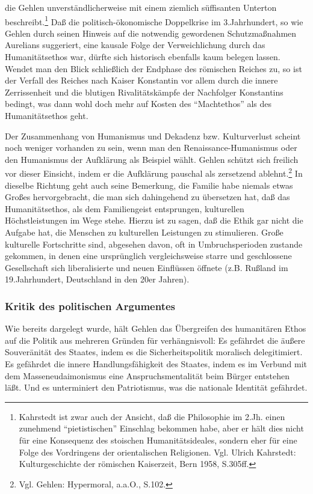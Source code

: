 \documentclass[12pt,a4paper]{article}
\begin{document}
die Gehlen unverständlicherweise mit einem ziemlich süffisanten Unterton
beschreibt.\footnote{Kahrstedt ist zwar auch der Ansicht, daß die Philosophie
  im 2.Jh. einen zunehmend "`pietistischen"' Einschlag bekommen habe, aber er
  hält dies nicht für eine Konsequenz des stoischen Humanitätsideales, sondern
  eher für eine Folge des Vordringens der orientalischen Religionen. Vgl.
  Ulrich Kahrstedt: Kulturgeschichte der römischen Kaiserzeit, Bern 1958,
  S.305ff.} Daß die politisch-ökonomische Doppelkrise im 3.Jahrhundert, so wie
Gehlen durch seinen Hinweis auf die notwendig gewordenen Schutzmaßnahmen
Aurelians suggeriert, eine kausale Folge der Verweichlichung durch das
Humanitätsethos war, dürfte sich historisch ebenfalls kaum belegen lassen.
Wendet man den Blick schließlich der Endphase des römischen Reiches zu, so ist
der Verfall des Reiches nach Kaiser Konstantin vor allem durch die innere
Zerrissenheit und die blutigen Rivalitätskämpfe der Nachfolger Konstantins
bedingt, was dann wohl doch mehr auf Kosten des "`Machtethos"' als des
Humanitätsethos geht.

Der Zusammenhang von Humanismus und Dekadenz bzw. Kulturverlust scheint noch
weniger vorhanden zu sein, wenn man den Renaissance-Humanismus oder den
Humanismus der Aufklärung als Beispiel wählt. Gehlen schützt sich freilich vor
dieser Einsicht, indem er die Aufklärung pauschal als zersetzend
ablehnt.\footnote{Vgl. Gehlen: Hypermoral, a.a.O., S.102.} In dieselbe
Richtung geht auch seine Bemerkung, die Familie habe niemals etwas Großes
hervorgebracht, die man sich dahingehend zu übersetzen hat, daß das
Humanitätsethos, als dem Familiengeist entsprungen, kulturellen
Höchstleistungen im Wege stehe. Hierzu ist zu sagen, daß die Ethik gar nicht
die Aufgabe hat, die Menschen zu kulturellen Leistungen zu stimulieren. Große
kulturelle Fortschritte sind, abgesehen davon, oft in Umbruchsperioden zustande
gekommen, in denen eine ursprünglich vergleichsweise starre und geschlossene
Gesellschaft sich liberalisierte und neuen Einflüssen öffnete (z.B. Rußland im
19.Jahrhundert, Deutschland in den 20er Jahren).

\subsubsection{Kritik des politischen Argumentes}

Wie bereits dargelegt wurde, hält Gehlen das Übergreifen des humanitären
Ethos auf die Politik aus mehreren Gründen für verhängnisvoll: Es gefährdet
die äußere Souveränität des Staates, indem es die Sicherheitspolitik
moralisch delegitimiert. Es gefährdet die innere Handlungsfähigkeit des
Staates, indem es im Verbund mit dem Masseneudaimonismus eine
Anspruchsmentalität beim Bürger entstehen läßt. Und es unterminiert den
Patriotismus, was die nationale Identität gefährdet.
\end{document}
